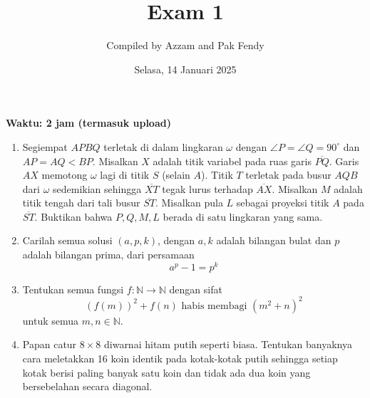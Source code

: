 \documentclass[12pt]{scrartcl}
\title{Exam 1}
\author{Compiled by Azzam and Pak Fendy}
\date{Selasa, 14 Januari 2025}
\begin{document}
\maketitle

\renewcommand*\contentsname{Daftar Isi}
\tableofcontents

\newpage
\textbf{Waktu: 2 jam (termasuk upload)}

\begin{enumerate}

\item Segiempat \( APBQ \) terletak di dalam lingkaran \( \omega \) dengan \( \angle P = \angle Q = 90^{\circ} \) dan \( AP = AQ < BP \). Misalkan \( X \) adalah titik variabel pada ruas garis \( \overline{PQ} \). Garis \( AX \) memotong \( \omega \) lagi di titik \( S \) (selain \( A \)). Titik \( T \) terletak pada busur \( AQB \) dari \( \omega \) sedemikian sehingga \( \overline{XT} \) tegak lurus terhadap \( \overline{AX} \). Misalkan \( M \) adalah titik tengah dari tali busur \( \overline{ST} \). Misalkan pula \( L \) sebagai proyeksi titik \(A\) pada \(\overline{ST}\). Buktikan bahwa \( P, Q, M, L\) berada di satu lingkaran yang sama.

\item Carilah semua solusi $(a,p,k)$, dengan $a,k$ adalah bilangan bulat dan $p$ adalah bilangan prima, dari persamaan $$a^p-1=p^k$$

\item Tentukan semua fungsi \( f: \mathbb{N} \to \mathbb{N} \) dengan sifat
   \[
   (f(m))^2 + f(n) \text{ habis membagi } (m^2 + n)^2
   \]
   untuk semua \( m, n \in \mathbb{N} \).

\item Papan catur \( 8 \times 8 \) diwarnai hitam putih seperti biasa. Tentukan banyaknya cara meletakkan 16 koin identik pada kotak-kotak putih sehingga setiap kotak berisi paling banyak satu koin dan tidak ada dua koin yang bersebelahan secara diagonal.

\end{enumerate}
\end{document}
